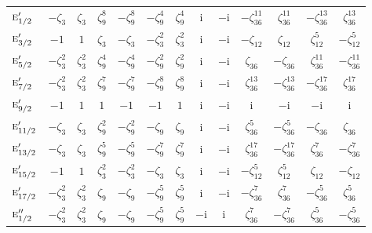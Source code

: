 \documentclass[10pt,a4paper]{article}
\makeatletter
\def\grouprule#1#2{\noalign{\marks\LTgroupmarks{\the\belowrulesep}\nobreak\vskip#1%
  \vskip\aboverulesep}\multispan\LT@cols\unskip{\leaders\hrule\@height#2\hfill\kern\z@}\cr
  \noalign{\penalty\LTrulebreak\vskip\belowrulesep\global\@lastruleclass\z@}}
\numberwithin{equation}{section}
\newcommand{\irr}[1]{\text{\normalfont\scshape #1}}
\newcommand{\iunit}{\mathrm{i}}
\newcommand{\rootunity}[1]{\zeta_{#1}}
\makeatother
\begin{document}
{\begin{longtable}{@{}lcccccccccccc@{}}
\grouprule{0pt}{\lightrulewidth}
$\irr{e}_{1/2}'$ & $-\rootunity{3}$ & $\rootunity{3}$ & $\rootunity{9}^{8}$ & $-\rootunity{9}^{8}$ & $-\rootunity{9}^{4}$ & $\rootunity{9}^{4}$ & $\iunit{}$ & $-\iunit{}$ & $-\rootunity{36}^{11}$ & $\rootunity{36}^{11}$ & $-\rootunity{36}^{13}$ & $\rootunity{36}^{13}$\\
$\irr{e}_{3/2}'$ & $-1$ & $1$ & $\rootunity{3}$ & $-\rootunity{3}$ & $-\rootunity{3}^{2}$ & $\rootunity{3}^{2}$ & $\iunit{}$ & $-\iunit{}$ & $-\rootunity{12}$ & $\rootunity{12}$ & $\rootunity{12}^{5}$ & $-\rootunity{12}^{5}$\\
$\irr{e}_{5/2}'$ & $-\rootunity{3}^{2}$ & $\rootunity{3}^{2}$ & $\rootunity{9}^{4}$ & $-\rootunity{9}^{4}$ & $-\rootunity{9}^{2}$ & $\rootunity{9}^{2}$ & $\iunit{}$ & $-\iunit{}$ & $\rootunity{36}$ & $-\rootunity{36}$ & $\rootunity{36}^{11}$ & $-\rootunity{36}^{11}$\\
$\irr{e}_{7/2}'$ & $-\rootunity{3}^{2}$ & $\rootunity{3}^{2}$ & $\rootunity{9}^{7}$ & $-\rootunity{9}^{7}$ & $-\rootunity{9}^{8}$ & $\rootunity{9}^{8}$ & $\iunit{}$ & $-\iunit{}$ & $\rootunity{36}^{13}$ & $-\rootunity{36}^{13}$ & $-\rootunity{36}^{17}$ & $\rootunity{36}^{17}$\\
$\irr{e}_{9/2}'$ & $-1$ & $1$ & $1$ & $-1$ & $-1$ & $1$ & $\iunit{}$ & $-\iunit{}$ & $\iunit{}$ & $-\iunit{}$ & $-\iunit{}$ & $\iunit{}$\\
$\irr{e}_{11/2}'$ & $-\rootunity{3}$ & $\rootunity{3}$ & $\rootunity{9}^{2}$ & $-\rootunity{9}^{2}$ & $-\rootunity{9}$ & $\rootunity{9}$ & $\iunit{}$ & $-\iunit{}$ & $\rootunity{36}^{5}$ & $-\rootunity{36}^{5}$ & $-\rootunity{36}$ & $\rootunity{36}$\\
$\irr{e}_{13/2}'$ & $-\rootunity{3}$ & $\rootunity{3}$ & $\rootunity{9}^{5}$ & $-\rootunity{9}^{5}$ & $-\rootunity{9}^{7}$ & $\rootunity{9}^{7}$ & $\iunit{}$ & $-\iunit{}$ & $\rootunity{36}^{17}$ & $-\rootunity{36}^{17}$ & $\rootunity{36}^{7}$ & $-\rootunity{36}^{7}$\\
$\irr{e}_{15/2}'$ & $-1$ & $1$ & $\rootunity{3}^{2}$ & $-\rootunity{3}^{2}$ & $-\rootunity{3}$ & $\rootunity{3}$ & $\iunit{}$ & $-\iunit{}$ & $-\rootunity{12}^{5}$ & $\rootunity{12}^{5}$ & $\rootunity{12}$ & $-\rootunity{12}$\\
$\irr{e}_{17/2}'$ & $-\rootunity{3}^{2}$ & $\rootunity{3}^{2}$ & $\rootunity{9}$ & $-\rootunity{9}$ & $-\rootunity{9}^{5}$ & $\rootunity{9}^{5}$ & $\iunit{}$ & $-\iunit{}$ & $-\rootunity{36}^{7}$ & $\rootunity{36}^{7}$ & $-\rootunity{36}^{5}$ & $\rootunity{36}^{5}$\\
$\irr{e}_{1/2}''$ & $-\rootunity{3}^{2}$ & $\rootunity{3}^{2}$ & $\rootunity{9}$ & $-\rootunity{9}$ & $-\rootunity{9}^{5}$ & $\rootunity{9}^{5}$ & $-\iunit{}$ & $\iunit{}$ & $\rootunity{36}^{7}$ & $-\rootunity{36}^{7}$ & $\rootunity{36}^{5}$ & $-\rootunity{36}^{5}$\\

\end{longtable}}
\end{document}
